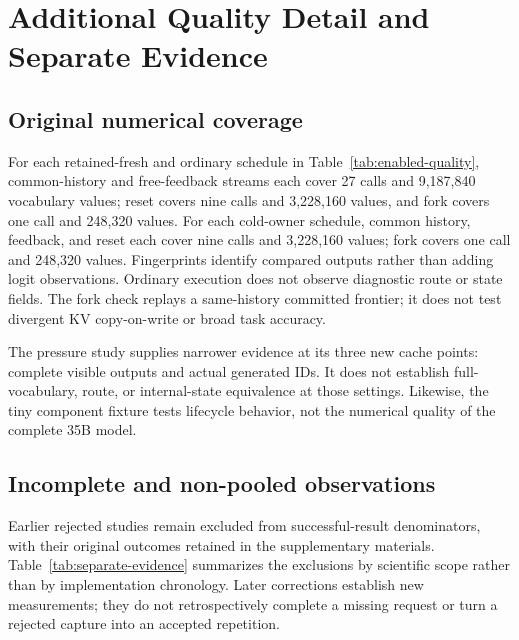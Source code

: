 \section{Additional Quality Detail and Separate Evidence}
\label{sec:historical-chronology}

\subsection{Original numerical coverage}
For each retained-fresh and ordinary schedule in
Table~\ref{tab:enabled-quality}, common-history and free-feedback streams each
cover 27 calls and 9,187,840 vocabulary values; reset covers nine calls and
3,228,160 values, and fork covers one call and 248,320 values. For each
cold-owner schedule, common history, feedback, and reset each cover nine
calls and 3,228,160 values; fork covers one call and 248,320 values.
Fingerprints identify compared outputs rather than adding logit observations.
Ordinary execution does not observe diagnostic route or state fields.
The fork check replays a same-history committed frontier; it does not test
divergent KV copy-on-write or broad task accuracy.

The pressure study supplies narrower evidence at its three new cache points:
complete visible outputs and actual generated IDs. It does not establish
full-vocabulary, route, or internal-state equivalence at those settings.
Likewise, the tiny component fixture tests lifecycle behavior, not the
numerical quality of the complete 35B model.

\subsection{Incomplete and non-pooled observations}
\label{sec:paired-startup-failure}
Earlier rejected studies remain excluded from successful-result denominators,
with their original outcomes retained in the supplementary materials.
Table~\ref{tab:separate-evidence} summarizes the exclusions by scientific
scope rather than by implementation chronology. Later corrections establish
new measurements; they do not retrospectively complete a missing request or
turn a rejected capture into an accepted repetition.

